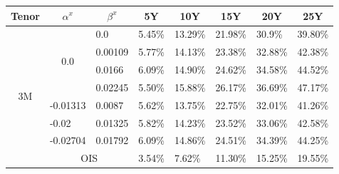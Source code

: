 \documentclass[12pt]{article}
\begin{document}
\begin{table}[H]
    \centering
    \begin{tabular}{|c||c||c||c|c|c|c|c|} \hline
    Tenor               & $\alpha^x$          & $\beta^x$                               &  5Y                      & 10Y                      & 15Y                     & 20Y                   & 25Y   \\ \hline \hline
    \multirow{8}{*}{3M} & \multirow{4}{*}{0.0}  & \multicolumn{1}{l||}{0.0}             & \multicolumn{1}{l|}{5.45\%}    & \multicolumn{1}{l|}{13.29\%}      & \multicolumn{1}{l|}{21.98\%} & \multicolumn{1}{l|}{30.9\%} & \multicolumn{1}{l|}{39.80\%}\\\cline{3-8}
                        &                          & \multicolumn{1}{l||}{0.00109}      & \multicolumn{1}{l|}{5.77\%} & \multicolumn{1}{l|}{14.13\%}     & \multicolumn{1}{l|}{23.38\%} & \multicolumn{1}{l|}{32.88\%} & \multicolumn{1}{l|}{42.38\%}\\\cline{3-8}
                        &                          & \multicolumn{1}{l||}{0.0166}       & \multicolumn{1}{l|}{6.09\%} & \multicolumn{1}{l|}{14.90\%}      & \multicolumn{1}{l|}{24.62\%} & \multicolumn{1}{l|}{34.58\%} & \multicolumn{1}{l|}{44.52\%}\\\cline{3-8}
                        &                          & \multicolumn{1}{l||}{0.02245}      & \multicolumn{1}{l|}{5.50\%} & \multicolumn{1}{l|}{15.88\%}      & \multicolumn{1}{l|}{26.17\%} & \multicolumn{1}{l|}{36.69\%} & \multicolumn{1}{l|}{47.17\%}\\\cline{2-8}
                        & \multicolumn{1}{l||}{-0.01313} & \multicolumn{1}{l||}{0.0087}  & \multicolumn{1}{l|}{5.62\%}    & \multicolumn{1}{l|}{13.75\%} & \multicolumn{1}{l|}{22.75\%} & \multicolumn{1}{l|}{32.01\%}& \multicolumn{1}{l|}{41.26\%} \\\cline{2-8}
                        & \multicolumn{1}{l||}{-0.02} & \multicolumn{1}{l||}{0.01325}    & \multicolumn{1}{l|}{5.82\%}     & \multicolumn{1}{l|}{14.23\%} & \multicolumn{1}{l|}{23.52\%} & \multicolumn{1}{l|}{33.06\%}& \multicolumn{1}{l|}{42.58\%} \\\cline{2-8}
                        & \multicolumn{1}{l||}{-0.02704} & \multicolumn{1}{l||}{0.01792}  & \multicolumn{1}{l|}{6.09\%}     & \multicolumn{1}{l|}{14.86\%} & \multicolumn{1}{l|}{24.51\%} & \multicolumn{1}{l|}{34.39\%}& \multicolumn{1}{l|}{44.25\%} \\\cline{2-8}
                        &  \multicolumn{2}{|c||}{OIS}                                   &  \multicolumn{1}{l|}{3.54\%} & \multicolumn{1}{l|}{7.62\%}      & \multicolumn{1}{l|}{11.30\%} & \multicolumn{1}{l|}{15.25\%} & \multicolumn{1}{l|}{19.55\%}\\ \hline \hline

\end{tabular}
\end{table}
\end{document}
